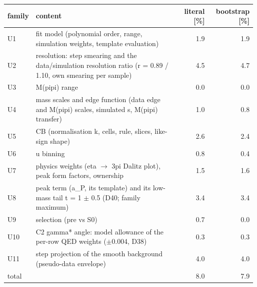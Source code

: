 \begin{tabular}{llrr}
\hline
 family & content & literal [\%] & bootstrap [\%] \\
\hline
 U1 & fit model (polynomial order, range, simulation weights, template evaluation) & 1.9 & 1.9 \\
 U2 & resolution: step smearing and the data/simulation resolution ratio (r = 0.89 / 1.10, own smearing per sample) & 4.5 & 4.7 \\
 U3 & M(pipi) range & 0.0 & 0.0 \\
 U4 & mass scales and edge function (data edge and M(pipi) scales, simulated s, M(pipi) transfer) & 1.0 & 0.8 \\
 U5 & CB (normalisation k, cells, rule, slices, like-sign shape) & 2.6 & 2.4 \\
 U6 & u binning & 0.8 & 0.4 \\
 U7 & physics weights (eta $\to$ 3pi Dalitz plot), peak form factors, ownership & 1.5 & 1.6 \\
 U8 & peak term (a\_P, its template) and its low-mass tail t = 1 $\pm$ 0.5 (D40; family maximum) & 3.4 & 3.4 \\
 U9 & selection (pre vs S0) & 0.7 & 0.0 \\
 U10 & C2 gamma* angle: model allowance of the per-row QED weights ($\pm$0.004, D38) & 0.3 & 0.3 \\
 U11 & step projection of the smooth background (pseudo-data envelope) & 4.0 & 4.0 \\
\hline
 total & & 8.0 & 7.9 \\
\hline
\end{tabular}
